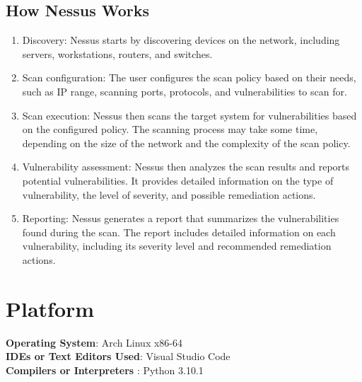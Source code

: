 \documentclass[11pt]{article}
\begin{document}
\subsection{How Nessus Works}
\begin{enumerate}
    \item Discovery: Nessus starts by discovering devices on the network, including servers, workstations, routers, and switches.
    \item Scan configuration: The user configures the scan policy based on their needs, such as IP range, scanning ports, protocols, and vulnerabilities to scan for.
    \item Scan execution: Nessus then scans the target system for vulnerabilities based on the configured policy. The scanning process may take some time, depending on the size of the network and the complexity of the scan policy.
    \item Vulnerability assessment: Nessus then analyzes the scan results and reports potential vulnerabilities. It provides detailed information on the type of vulnerability, the level of severity, and possible remediation actions.
    \item Reporting: Nessus generates a report that summarizes the vulnerabilities found during the scan. The report includes detailed information on each vulnerability, including its severity level and recommended remediation actions.
\end{enumerate}

\section{Platform}
\textbf{\textbf{Operating System}}: Arch Linux x86-64 \\
\textbf{\textbf{IDEs or Text Editors Used}}: Visual Studio Code\\
\textbf{\textbf{Compilers or Interpreters} }: Python 3.10.1\\
\end{document}
